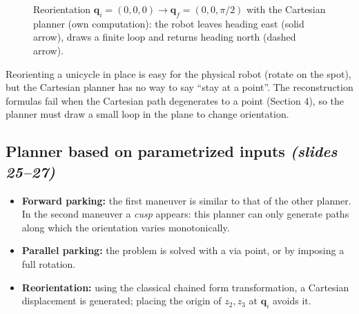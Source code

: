 \documentclass[11pt,a4paper]{article}
\newcommand{\qi}{\boldsymbol{q}_i}
\newcommand{\qf}{\boldsymbol{q}_f}
\theoremstyle{definition}
\theoremstyle{plain}
\theoremstyle{remark}
\begin{document}
\begin{figure}[H]
\centering
{}
\caption{Reorientation $\qi=(0,0,0)\to\qf=(0,0,\pi/2)$ with the Cartesian planner (own computation): the robot leaves heading east
(solid arrow), draws a finite loop and returns heading north (dashed arrow).}
\end{figure}

\begin{intuition}
Reorienting a unicycle in place is easy for the physical robot (rotate on the spot), but the Cartesian planner has no way to say
``stay at a point''. The reconstruction formulas fail when the Cartesian path degenerates to a point (Section 4), so the planner must
draw a small loop in the plane to change orientation.
\end{intuition}

\subsection{Planner based on parametrized inputs \emph{(slides 25--27)}}

\begin{itemize}
\item \textbf{Forward parking:} the first maneuver is similar to that of the other planner. In the second maneuver a \emph{cusp} appears: this planner can only generate paths along which the orientation varies monotonically.
\item \textbf{Parallel parking:} the problem is solved with a via point, or by imposing a full rotation.
\item \textbf{Reorientation:} using the classical chained form transformation, a Cartesian displacement is generated; placing the origin of $z_2,z_3$ at $\qi$ avoids it.
\end{itemize}
\end{document}
